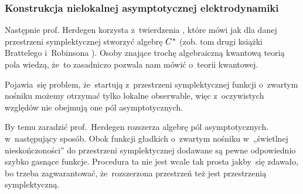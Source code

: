 \documentclass[10pt,t]{beamer}
\begin{document}










\begin{frame}
  \frametitle{Konstrukcja nielokalnej asymptotycznej
    elektrodynamiki}


  Następnie prof. Herdegen korzysta z~twierdzenia
  ,
  które mówi jak dla danej przestrzeni symplektycznej stworzyć algebrę
  $C^{ \hspace{0.05em} * }$ (zob. tom drugi książki Brattelego i~Robinsona
  \parencite{Bratteli-Robinson-Operator-algebras-ETC-Vol-I-Pub-2002}).
  Osoby znające trochę algebraiczną kwantową teorią pola wiedzą, że~to
  zasadniczo pozwala nam mówić o~teorii kwantowej.

  Pojawia~się problem, że~startują z~przestrzeni symplektycznej funkcji
  o~zwartym nośniku możemy otrzymać tylko \alert{lokalne} obserwable,
  więc z~oczywistych względów nie obejmują one pól asymptotycznych.

  By temu zaradzić prof.~Herdegen rozszerza algebrę pól asymptotycznych.
  w~następujący sposób. Obok funkcji gładkich o~zwartym nośniku
  w~„świetlnej nieskończoności” do przestrzeni symplektycznej dodawane
  są pewne odpowiednio szybko gasnące funkcje. Procedura ta nie jest wcale
  tak prosta jakby~się zdawało, bo trzeba zagwarantować, że~rozszerzona
  przestrzeń też jest przestrzenią symplektyczną.

\end{frame}
\end{document}
